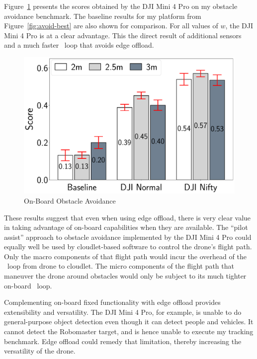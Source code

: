 Figure~\ref{fig:avoidance_dji} presents the scores obtained by the DJI
Mini 4 Pro  on my obstacle avoidance benchmark.  The baseline results
for my platform from Figure~\ref{fig:avoid-best} are also shown for
comparison.  For all values of $w$, the DJI Mini 4 Pro  is at a clear
advantage.  This the direct result of additional sensors and a much
faster \ooda~loop that avoids edge offload.

\begin{figure}
\centering
\includegraphics[width=0.8\linewidth]{chapter6/FIGS/fig-avoidance-dji.pdf}
\caption{On-Board Obstacle Avoidance}
\label{fig:avoidance_dji}
\end{figure}

These results suggest that even when using edge offload, there is very
clear value in taking advantage of on-board capabilities when they are
available.  The ``pilot assist'' approach to obstacle avoidance
implemented by the DJI Mini 4 Pro could equally well be used by
cloudlet-based software to control the drone's flight path.  Only the
macro components of that flight path would incur the overhead of the
\ooda~loop from drone to cloudlet.  The micro components of the flight
path that maneuver the drone around obstacles would only be subject to
its much tighter on-board \ooda~loop.

Complementing on-board fixed functionality with edge offload provides
extensibility and versatility.  The DJI Mini 4 Pro, for example, is
unable to do general-purpose object detection even though it can
detect people and vehicles.  It cannot detect the Robomaster target, and is hence
unable to execute my tracking benchmark.  Edge offload could remedy
that limitation, thereby increasing the versatility of the drone.